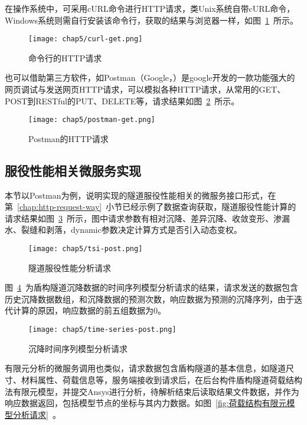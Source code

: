 在操作系统中，可采用cURL命令进行HTTP请求，类Unix系统自带cURL命令，Windows系统则需自行安装该命令行，获取的结果与浏览器一样，如图~\ref{fig:命令行的HTTP请求}~所示。

\begin{figure}[htb!]
    \centering
    \texttt{[image: chap5/curl-get.png]}
    \caption{命令行的HTTP请求}
    \label{fig:命令行的HTTP请求}
\end{figure}

也可以借助第三方软件，如Postman（Google，\citeyear{postman2018}）是google开发的一款功能强大的网页调试与发送网页HTTP请求，可以模拟各种HTTP请求，从常用的GET、POST到RESTful的PUT、DELETE等，请求结果如图~\ref{fig:Postman的HTTP请求}~所示。

\begin{figure}[htb!]
    \centering
    \texttt{[image: chap5/postman-get.png]}
    \caption{Postman的HTTP请求}
    \label{fig:Postman的HTTP请求}
\end{figure}

\subsection{服役性能相关微服务实现}

本节以Postman为例，说明实现的隧道服役性能相关的微服务接口形式，在第~\ref{chap:http-request-way}~小节已经示例了数据查询获取，隧道服役性能计算的请求结果如图~\ref{fig:隧道服役性能分析请求}~所示，图中请求参数有相对沉降、差异沉降、收敛变形、渗漏水、裂缝和剥落，dynamic参数决定计算方式是否引入动态变权。

\begin{figure}[htb!]
    \centering
    \texttt{[image: chap5/tsi-post.png]}
    \caption{隧道服役性能分析请求}
    \label{fig:隧道服役性能分析请求}
\end{figure}

图~\ref{fig:沉降时间序列模型分析请求}~为盾构隧道沉降数据的时间序列模型分析请求的结果，请求发送的数据包含历史沉降数据数组，和沉降数据的预测次数，响应数据为预测的沉降序列，由于迭代计算的原因，响应数据的前五组数据为0。

\begin{figure}[htb!]
    \centering
    \texttt{[image: chap5/time-series-post.png]}
    \caption{沉降时间序列模型分析请求}
    \label{fig:沉降时间序列模型分析请求}
\end{figure}

有限元分析的微服务调用也类似，请求数据包含盾构隧道的基本信息，如隧道尺寸、材料属性、荷载信息等，服务端接收到请求后，在后台构件盾构隧道荷载结构法有限元模型，并提交Ansys进行分析，待解析结束后读取结果文件数据，并作为响应数据返回，包括模型节点的坐标与其内力数据。如图~\ref{fig:荷载结构有限元模型分析请求}~。

